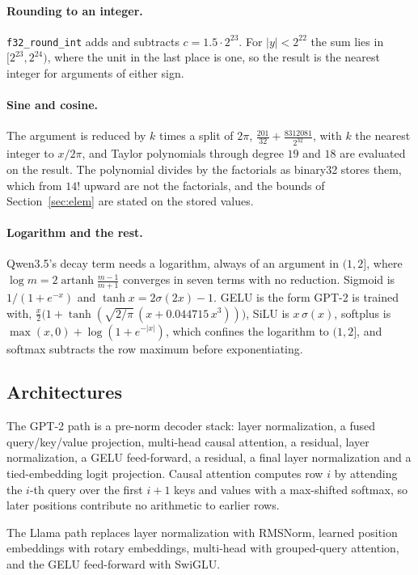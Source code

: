 \documentclass[11pt]{article}
\theoremstyle{plain}
\theoremstyle{definition}
\newcommand{\code}[1]{\texttt{#1}}
\begin{document}
\paragraph{Rounding to an integer.} \code{f32\_round\_int} adds and subtracts
$c = 1.5\cdot2^{23}$. For $|y| < 2^{22}$ the sum lies in $[2^{23}, 2^{24})$,
where the unit in the last place is one, so the result is the nearest integer
for arguments of either sign.

\paragraph{Sine and cosine.} The argument is reduced by $k$ times a split of
$2\pi$, $\frac{201}{32} + \frac{8312081}{2^{32}}$, with $k$ the nearest integer
to $x/2\pi$, and Taylor polynomials through degree $19$ and $18$ are evaluated
on the result. The polynomial divides by the factorials as binary32 stores
them, which from $14!$ upward are not the factorials, and the bounds of
Section~\ref{sec:elem} are stated on the stored values.

\paragraph{Logarithm and the rest.} Qwen3.5's decay term needs a logarithm,
always of an argument in $(1, 2]$, where
$\log m = 2\operatorname{artanh}\frac{m-1}{m+1}$ converges in seven terms with no
reduction. Sigmoid is $1/(1+e^{-x})$ and $\tanh x = 2\sigma(2x) - 1$. GELU is the
form GPT-2 is trained with,
$\frac{x}{2}\bigl(1 + \tanh(\sqrt{2/\pi}\,(x + 0.044715\,x^3))\bigr)$, SiLU is
$x\,\sigma(x)$, softplus is $\max(x,0) + \log(1 + e^{-|x|})$, which confines the
logarithm to $(1, 2]$, and softmax subtracts the row maximum before
exponentiating.

\subsection{Architectures}

The GPT-2 path is a pre-norm decoder stack: layer normalization, a fused
query/key/value projection, multi-head causal attention, a residual, layer
normalization, a GELU feed-forward, a residual, a final layer normalization and
a tied-embedding logit projection. Causal attention computes row $i$ by
attending the $i$-th query over the first $i + 1$ keys and values with a
max-shifted softmax, so later positions contribute no arithmetic to earlier
rows.

The Llama path replaces layer normalization with RMSNorm, learned position
embeddings with rotary embeddings, multi-head with grouped-query attention, and
the GELU feed-forward with SwiGLU.
\end{document}
